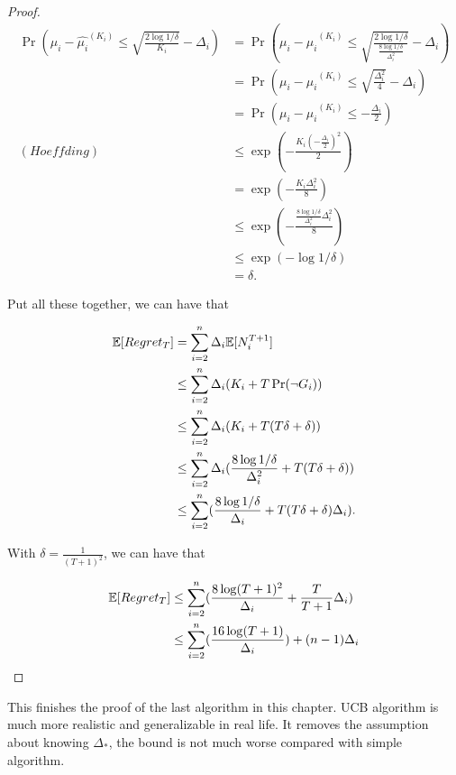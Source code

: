 \documentclass[../main.tex]{subfiles}
\begin{document}
\begin{proof}
		\begin{equation*}
			\begin{aligned}
				\Pr(\mu_i  - \hat{\mu_i}^{(K_i)} \leq  \sqrt{\frac{2\log 1/ \delta}{K_i}} - \Delta_i ) & = \Pr(\mu_i  - \hat{\mu_i}^{(K_i)} \leq  \sqrt{\frac{2\log 1/ \delta}{ \frac{8 \log 1 / \delta}{\Delta_i^2} }} - \Delta_i ) \\
				& = \Pr(\mu_i  - \hat{\mu_i}^{(K_i)} \leq  \sqrt{\frac{\Delta_i^2}{4 }} - \Delta_i ) \\
				& = \Pr(\mu_i  - \hat{\mu_i}^{(K_i)} \leq  - \frac{\Delta_i}{2} ) \\
		(Hoeffding) \ & \leq \exp(-\frac{K_i (-\frac{\Delta_i}{2})^2}{2}) \\
					& = \exp(-\frac{K_i \Delta_i^2}{8}) \\
					& \leq \exp(-\frac{\frac{8 \log 1 / \delta}{\Delta_i^2} \Delta_i^2}{8}) \\
					& \leq \exp(-\log 1/\delta)\\
					& = \delta.
			\end{aligned}
		\end{equation*}
		
		Put all these together, we can have that 
		
		\begin{equation*}
			\begin{aligned}
				\mathbb{E}[Regret_T] & = \sum\limits_{i=2}^n \Delta_i \mathbb{E}[N_i^{T+1}] \\	
							  & \leq \sum\limits_{i=2}^n \Delta_i (K_i + T \Pr(\neg G_i)) \\
							  & \leq \sum\limits_{i=2}^n \Delta_i (K_i + T (T\delta + \delta)) \\
							  &\leq  \sum\limits_{i=2}^n \Delta_i (\frac{8 \log 1 / \delta}{\Delta_i^2} + T (T\delta + \delta)) \\
							  & \leq  \sum\limits_{i=2}^n (\frac{8 \log 1 / \delta}{\Delta_i} + T (T\delta + \delta)\Delta_i) .
			\end{aligned}
		\end{equation*}
		
		With $\delta = \frac{1}{(T+1)^2}$, we can have that 
		
		\begin{equation*}
			\begin{aligned}
				\mathbb{E}[Regret_T] & \leq \sum\limits_{i=2}^n (\frac{8 \log (T+1)^2}{\Delta_i} + \frac{T}{T+1} \Delta_i) \\
							  &	\leq \sum\limits_{i=2}^n (\frac{16 \log(T+1)}{\Delta_i}) + (n-1) \Delta_i \\				
			\end{aligned}
		\end{equation*}
	\end{proof}

	This finishes the proof of the last algorithm in this chapter. UCB algorithm is much more realistic and generalizable in real life. It removes the assumption about knowing $\Delta_*$, the bound is not much worse compared with simple algorithm.
\end{document}
